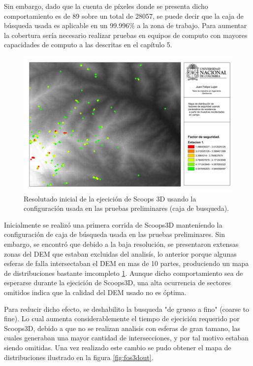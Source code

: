 Sin embargo, dado que la cuenta de p\'ixeles donde se presenta dicho comportamiento es de 89 sobre un total de 28057, se puede decir que la caja de b\'usqueda usada es aplicable en un 99.996\% a la zona de trabajo.
Para aumentar la cobertura ser\'ia necesario realizar pruebas en equipos de computo con mayores capacidades de computo a las descritas en el cap\'itulo 5.


\begin{figure}[H]
\centering
\includegraphics[scale=0.3]{img/fos3DCampo_coarse.pdf}
\caption{Resolutado inicial de la ejecici\'on de Scoops 3D usando la configuraci\'on usada en las pruebas preliminares (caja de busqueda).}
\label{fig:fos3dout_coarse}
\end{figure}

Inicialmente se realiz\'o una primera corrida de Scoops3D manteniendo la configuraci\'on de caja de b\'usqueda usada en las pruebas preliminares. Sin embargo, se encontr\'o que debido a la baja resoluci\'on, se presentaron extensas zonas del DEM que estaban excluidas del analis\'is, lo anterior porque algunas esferas de falla intersectaban el DEM en mas de 10 partes,  produciendo un mapa de distribuciones bastante imcompleto \ref{fig:fos3dout_coarse}. Aunque dicho comportamiento sea de esperarse durante la ejecici\'on de Scoops3D, una alta ocurrencia de sectores omitidos indica que la calidad del DEM usado no es \'optima.

Para reducir dicho efecto, se deshabilito la busqueda "de grueso a fino" (coarse to fine). Lo cual aumenta considerablemente el tiempo de ejecici\'on requerido por Scoops3D, debido a que no se realizan analisis con esferas de gran tamano, las cuales generaban una mayor cantidad de intersecciones, y por tal motivo estaban siendo omitidas.
Una vez realizado este cambio se pudo obtener el mapa de distribuciones ilustrado en la figura \ref{fig:fos3dout}.

